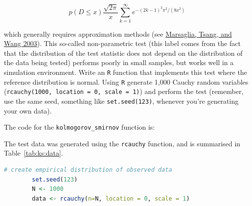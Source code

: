 \documentclass[12pt,letterpaper]{article}
\begin{document}
$$p(D \leq x) \frac{\sqrt {2\pi}}{x} \sum _{k=1}^{\infty }e^{-(2k-1)^{2}\pi ^{2}/(8x^{2})}$$


\noindent which generally requires approximation methods (see \href{https://core.ac.uk/download/pdf/25787785.pdf}{Marsaglia, Tsang, and Wang 2003}). This so-called non-parametric test (this label comes from the fact that the distribution of the test statistic does not depend on the distribution of the data being tested) performs poorly in small samples, but works well in a simulation environment. Write an \texttt{R} function that implements this test where the reference distribution is normal. Using \texttt{R} generate 1,000 Cauchy random variables (\texttt{rcauchy(1000, location = 0, scale = 1)}) and perform the test (remember, use the same seed, something like \texttt{set.seed(123)}, whenever you're generating your own data).\\

  The code for the \texttt{kolmogorov\_smirnov} function is:

  

  The test data was generated using the \texttt{rcauchy} function, and is  summarised in Table~\ref{tab:ks:data}.
	\begin{lstlisting}[language=R]
		# create empirical distribution of observed data
		set.seed(123)
		N <- 1000
		data <- rcauchy(n=N, location = 0, scale = 1)
	\end{lstlisting}

  

\end{document}
